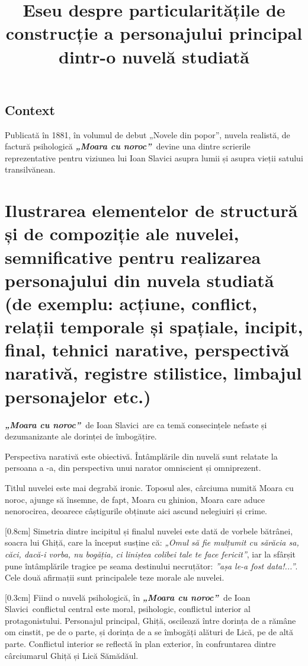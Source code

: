 \documentclass[
12pt,
a4paper
]{article}
\title{Eseu despre particularitățile de construcție a personajului principal dintr-o nuvelă studiată}
\date{}   %
\author{} %
\newcommand{\rom}[1]{\uppercase\expandafter{\romannumeral #1\relax}} %
\newcommand{\operatitle}{\textbf{\textit{„Moara cu noroc”\ }}} %
\newcommand{\operaauthor}{Ioan Slavici\ }                               %
\begin{document}
\maketitle %



\subsection{Context}

Publicată în 1881, în volumul de debut „Novele din popor”, nuvela realistă, de factură psihologică \operatitle devine una dintre scrierile reprezentative pentru viziunea lui Ioan Slavici asupra lumii și asupra vieții satului transilvănean.

\section{Ilustrarea elementelor de structură și de compoziție ale nuvelei, semnificative pentru realizarea personajului din nuvela studiată {\footnotesize (de exemplu: acțiune, conflict, relații temporale și spațiale, incipit, final, tehnici narative, perspectivă narativă, registre stilistice, limbajul personajelor etc.)}}

\operatitle de \operaauthor are ca temă consecințele nefaste și dezumanizante ale dorinței de îmbogățire.

Perspectiva narativă este obiectivă. Întâmplările din nuvelă sunt relatate la persoana a \rom{3}-a, din perspectiva unui narator omniscient și omniprezent.

Titlul nuvelei este mai degrabă ironic. Toposul ales, cârciuma numită Moara cu noroc, ajunge să însemne, de fapt, Moara cu ghinion, Moara care aduce nenorocirea, deoarece câștigurile obținute aici ascund nelegiuiri și crime.

[0.8cm]
Simetria dintre incipitul și finalul nuvelei este dată de vorbele bătrânei, soacra lui Ghiță, care la început susține că: \textit{„Omul să fie mulțumit cu sărăcia sa, căci, dacă-i vorba, nu bogăția, ci liniștea colibei tale te face fericit”}, iar la sfârșit pune întâmplările tragice pe seama destinului necruțător: \textit{”așa le-a fost data!...”}. Cele două afirmații sunt principalele teze morale ale nuvelei.

[0.3cm]
Fiind o nuvelă psihologică, în \operatitle de \operaauthor conflictul central este moral, psihologic, conflictul interior al protagonistului. Personajul principal, Ghiță, oscilează între dorința de a rămâne om cinstit, pe de o parte, și dorința de a se îmbogăți alături de Lică, pe de altă parte. Conflictul interior se reflectă în plan exterior, în confruntarea dintre cârciumarul Ghiță și Lică Sămădăul.
\end{document}
